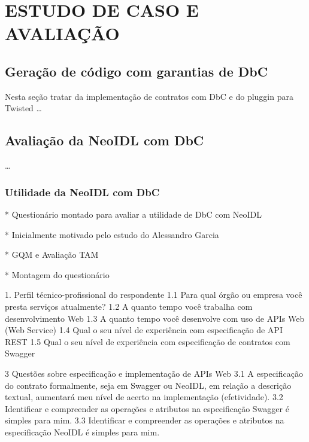 \chapter{ESTUDO DE CASO E AVALIAÇÃO}
\vspace{-6mm}


\section{Geração de código com garantias de DbC}
\vspace{-6mm}

Nesta seção tratar da implementação de contratos com DbC e do pluggin para
Twisted \ldots
\vspace{-6mm}


\section{Avaliação da NeoIDL com DbC}
\vspace{-6mm}

\ldots

\subsection{Utilidade da NeoIDL com DbC}
\vspace{-6mm}


* Questionário montado para avaliar a utilidade de DbC com NeoIDL

* Inicialmente motivado pelo estudo do Alessandro Garcia

* GQM e Avaliação TAM

* Montagem do questionário

1. Perfil técnico-profissional do respondente
1.1 Para qual órgão ou empresa você presta serviços atualmente?
1.2 A quanto tempo você trabalha com desenvolvimento Web
1.3 A quanto tempo você desenvolve com uso de APIs Web (Web Service)
1.4 Qual o seu nível de experiência com especificação de API REST
1.5 Qual o seu nível de experiência com especificação de contratos com Swagger

3 Questões sobre especificação e implementação de APIs Web
3.1 A especificação do contrato formalmente, seja em Swagger ou NeoIDL, em
relação a descrição textual, aumentará meu nível de acerto na implementação (efetividade).
3.2 Identificar e compreender as operações e atributos na especificação Swagger
é simples para mim.
3.3 Identificar e compreender as operações e atributos na especificação NeoIDL é
simples para mim.

